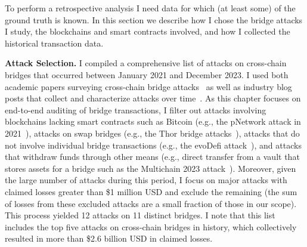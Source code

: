 
To perform a retrospective analysis I need data for which (at
least some) of the ground truth is known.   In this section we
describe how I chose the bridge attacks I study, the blockchains and
smart contracts involved, and how I collected the historical
transaction data.

\textbf{Attack Selection.}
%
I compiled a comprehensive list of attacks on cross-chain
bridges that occurred between January 2021 and December 2023.  I used both academic papers surveying cross-chain
bridge attacks~\cite{lee2023sok, zhang2023sok, zhao2023comprehensive} as well
as industry blog posts that collect and characterize attacks over time~\cite{GithubBridgeBugTracker, SlowMistHackedBridges:online,
  REKTDB:online, Web3Great:online, GithubBridgeHacks2:online}. 
As this chapter focuses on end-to-end auditing of bridge transactions, I filter out attacks
involving blockchains lacking smart contracts such
as Bitcoin (e.g., the pNetwork attack in 2021~\cite{pNetworkhack:online}), attacks on swap bridges (e.g., the Thor bridge attacks~\cite{Thorhack1:online,Thorhack2:online}), attacks that do not involve individual bridge transactions (e.g., the evoDefi attack~\cite{evoDefihack:online}),
and attacks that withdraw funds through other means (e.g., direct transfer from a vault that stores assets for a bridge such as the Multichain 2023 attack~\cite{Multichainhack:online}).  Moreover, given the large number of attacks during this period, I focus on
major attacks with claimed losses greater than \$1 million USD and
exclude the remaining (the sum of losses from these excluded attacks are a small fraction of those in our scope).
%
%
This process yielded 12 attacks on 11 distinct bridges.
I note that this list
includes the top five attacks on cross-chain bridges in history, which
collectively resulted in more than \$2.6 billion USD in claimed losses.

